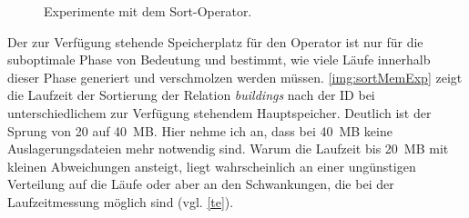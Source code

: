 \documentclass[a4paper,12pt,twoside]{article}
\newcommand{\Fb}[1]{\textit{#1}} %
\begin{document}
\begin{figure}
	\centering
	\qquad
	\qquad
	\caption{Experimente mit dem Sort-Operator.}
	\label{img:sortExpAllg}
\end{figure}

Der zur Verfügung stehende Speicherplatz für den Operator ist nur für die suboptimale Phase von Bedeutung und bestimmt, wie viele Läufe innerhalb dieser Phase generiert und verschmolzen werden müssen. \autoref{img:sortMemExp} zeigt die Laufzeit der Sortierung der Relation \Fb{buildings} nach der ID bei unterschiedlichem zur Verfügung stehendem Hauptspeicher. Deutlich ist der Sprung von 20 auf 40~MB. Hier nehme ich an, dass bei 40~MB keine Auslagerungsdateien mehr notwendig sind. Warum die Laufzeit bis 20~MB mit kleinen Abweichungen ansteigt, liegt wahrscheinlich an einer ungünstigen Verteilung auf die Läufe oder aber an den Schwankungen, die bei der Laufzeitmessung möglich sind (vgl. \autoref{te}).
\end{document}
